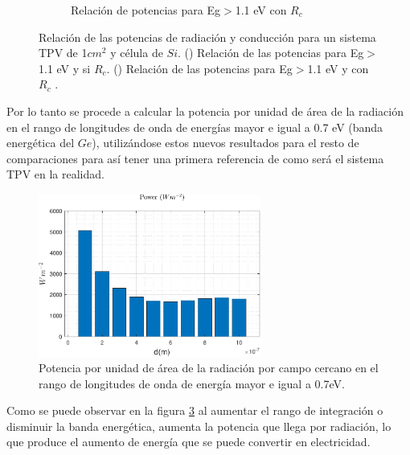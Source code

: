 \begin{figure}[H]
\begin{subfigure}[b]{0.49\textwidth}
	\caption{Relación de potencias para Eg$>$1.1 eV con $R_c$}
	\label{fig:rel_SiSi11_Rc}
\end{subfigure}
\caption{Relación de las potencias de radiación y conducción para un sistema TPV de 1$cm^2$ y célula de $Si$. () Relación de las potencias para Eg$>$1.1 eV y si $R_c$. () Relación de las potencias para Eg$>$1.1 eV y con $R_c$ \cite{nf_TPV_Pillars_SiO2}.}
	\label{fig:rels_SiSi11}
\end{figure}
Por lo tanto se procede a calcular la potencia por unidad de área de la radiación en el rango de longitudes de onda de energías mayor e igual a 0.7 eV (banda energética del $Ge$), utilizándose estos nuevos resultados para el resto de comparaciones para así tener una primera referencia de como será el sistema TPV en la realidad.
\begin{figure}[H]
	\centering
		\includegraphics[width=0.65\textwidth]{figuras/Resultados/radiacion/p_Eg_SiSi.pdf}
	\caption{Potencia por unidad de área de la radiación por campo cercano en el rango de longitudes de onda de energía mayor e igual a 0.7eV.}
	\label{fig:p_Eg_SiSi}
\end{figure}
Como se puede observar en la figura \ref{fig:p_Eg_SiSi} al aumentar el rango de integración o disminuir la banda energética, aumenta la potencia que llega por radiación, lo que produce el aumento de energía que se puede convertir en electricidad.

